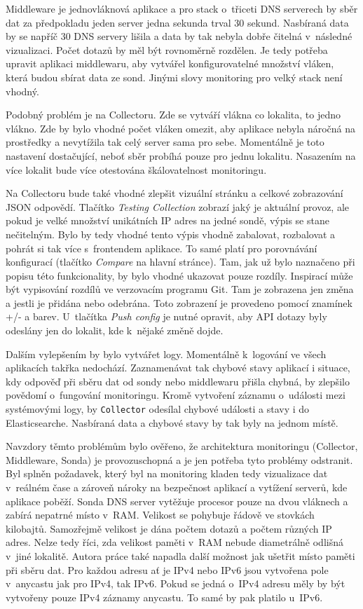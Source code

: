 \documentclass[thesis=M,czech]{src/FITthesis}[2019/12/23]
\begin{document}
Middleware je jednovláknová aplikace a pro stack o~třiceti DNS serverech by sběr dat za předpokladu jeden server jedna sekunda trval 30 sekund. Nasbíraná data by se napříč 30 DNS servery lišila a data by tak nebyla dobře čitelná v~následné vizualizaci. Počet dotazů by měl být rovnoměrně rozdělen. Je tedy potřeba upravit aplikaci middlewaru, aby vytvářel konfigurovatelné množství vláken, která budou sbírat data ze sond. Jinými slovy monitoring pro velký stack není vhodný.

Podobný problém je na Collectoru. Zde se vytváří vlákna co lokalita, to jedno vlákno. Zde by bylo vhodné počet vláken omezit, aby aplikace nebyla náročná na prostředky a nevytížila tak celý server sama pro sebe. Momentálně je toto nastavení dostačující, neboť sběr probíhá pouze pro jednu lokalitu. Nasazením na více lokalit bude více otestována škálovatelnost monitoringu.

Na Collectoru bude také vhodné zlepšit vizuální stránku a celkové zobrazování JSON odpovědí. Tlačítko \textit{Testing Collection} zobrazí jaký je aktuální provoz, ale pokud je velké množství unikátních IP adres na jedné sondě, výpis se stane nečitelným. Bylo by tedy vhodné tento výpis vhodně zabalovat, rozbalovat a pohrát si tak více s~frontendem aplikace. To samé platí pro porovnávání konfigurací (tlačítko \textit{Compare} na hlavní stránce). Tam, jak už bylo naznačeno při popisu této funkcionality, by bylo vhodné ukazovat pouze rozdíly. Inspirací může být vypisování rozdílů ve verzovacím programu Git. Tam je zobrazena jen změna a jestli je přidána nebo odebrána. Toto zobrazení je provedeno pomocí znamínek +/- a barev. U~tlačítka \textit{Push config} je nutné opravit, aby API dotazy byly odeslány jen do lokalit, kde k~nějaké změně dojde.

Dalším vylepšením by bylo vytvářet logy. Momentálně k~logování ve všech aplikacích takřka nedochází. Zaznamenávat tak chybové stavy aplikací i situace, kdy odpověď při sběru dat od sondy nebo middlewaru přišla chybná, by zlepšilo povědomí o~fungování monitoringu. Kromě vytvoření záznamu o~události mezi systémovými logy, by \texttt{Collector} odesílal chybové události a stavy i do Elasticsearche. Nasbíraná data a chybové stavy by tak byly na jednom místě. 

Navzdory těmto problémům bylo ověřeno, že architektura monitoringu (Collector, Middleware, Sonda) je provozuschopná a je jen potřeba tyto \linebreak problémy odstranit. Byl splněn požadavek, který byl na monitoring kladen tedy vizualizace dat v~reálném čase a zároveň nároky na bezpečnost aplikací a vytížení serverů, kde aplikace poběží. Sonda DNS server vytěžuje procesor pouze na dvou vláknech a zabírá nepatrné místo v~RAM. Velikost se pohybuje řádově ve stovkách kilobajtů. Samozřejmě velikost je dána počtem dotazů a počtem různých IP adres. Nelze tedy říci, zda velikost paměti v~RAM nebude diametrálně odlišná v~jiné lokalitě. Autora práce také napadla další možnost jak ušetřit místo paměti při sběru dat. Pro každou adresu ať je IPv4 nebo IPv6 jsou vytvořena pole v~anycastu jak pro IPv4, tak IPv6. Pokud se jedná o~IPv4 adresu měly by být vytvořeny pouze IPv4 záznamy anycastu. To samé by pak platilo u~IPv6. 
\end{document}

